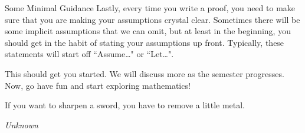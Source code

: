 \begin{section}{Some Minimal Guidance}
Lastly, every time you write a proof, you need to make sure that you are making your assumptions crystal clear.  Sometimes there will be some implicit assumptions that we can omit, but at least in the beginning, you should get in the habit of stating your assumptions up front.  Typically, these statements will start off ``Assume\ldots" or ``Let\ldots".  

This should get you started.  We will discuss more as the semester progresses.  Now, go have fun and start exploring mathematics!

\epigraph{If you want to sharpen a sword, you have to remove a little metal.}{\emph{Unknown}}

\end{section}